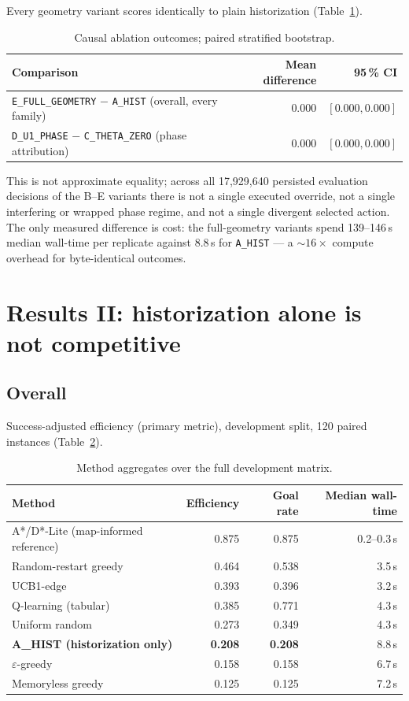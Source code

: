 \documentclass[11pt]{article}
\begin{document}
Every geometry variant scores identically to plain historization
(Table~\ref{tab:geometry}).

\begin{table}[ht]
\centering
\begin{tabular}{lrr}
\toprule
Comparison & Mean difference & 95\,\% CI \\
\midrule
\texttt{E\_FULL\_GEOMETRY} $-$ \texttt{A\_HIST} (overall, every family) & $0.000$ & $[0.000, 0.000]$ \\
\texttt{D\_U1\_PHASE} $-$ \texttt{C\_THETA\_ZERO} (phase attribution) & $0.000$ & $[0.000, 0.000]$ \\
\bottomrule
\end{tabular}
\caption{Causal ablation outcomes; paired stratified bootstrap.}
\label{tab:geometry}
\end{table}

This is not approximate equality; across all 17{,}929{,}640 persisted
evaluation decisions of the B--E variants there is not a single executed
override, not a single interfering or wrapped phase regime, and not a single
divergent selected action. The only measured difference is cost: the
full-geometry variants spend 139--146\,s median wall-time per replicate
against 8.8\,s for \texttt{A\_HIST} --- a ${\sim}16\times$ compute overhead
for byte-identical outcomes.

\section{Results II: historization alone is not competitive}\label{sec:results2}

\subsection{Overall}

Success-adjusted efficiency (primary metric), development split, 120 paired
instances (Table~\ref{tab:methods}).

\begin{table}[ht]
\centering
\begin{tabular}{lrrr}
\toprule
Method & Efficiency & Goal rate & Median wall-time \\
\midrule
A*/D*-Lite (map-informed reference) & 0.875 & 0.875 & 0.2--0.3\,s \\
Random-restart greedy & 0.464 & 0.538 & 3.5\,s \\
UCB1-edge & 0.393 & 0.396 & 3.2\,s \\
Q-learning (tabular) & 0.385 & 0.771 & 4.3\,s \\
Uniform random & 0.273 & 0.349 & 4.3\,s \\
\textbf{A\_HIST (historization only)} & \textbf{0.208} & \textbf{0.208} & 8.8\,s \\
$\varepsilon$-greedy & 0.158 & 0.158 & 6.7\,s \\
Memoryless greedy & 0.125 & 0.125 & 7.2\,s \\
\bottomrule
\end{tabular}
\caption{Method aggregates over the full development matrix.}
\label{tab:methods}
\end{table}
\end{document}
